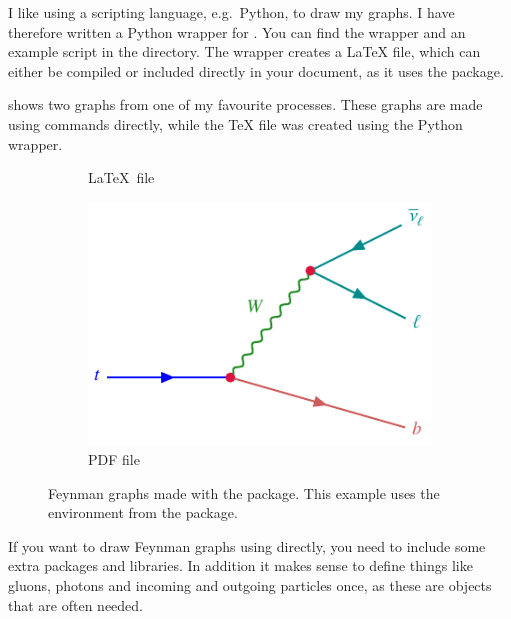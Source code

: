 I like using a scripting language, e.g.\ Python, to draw my graphs.
I have therefore written a Python wrapper for .
You can find the wrapper and an example script in the  directory.
The wrapper creates a \LaTeX{} file,
which can either be compiled or included directly in your document,
as it uses the  package.

 shows two graphs from one of my favourite processes.
These graphs are made using  commands directly,
while the \TeX{} file was created using the Python wrapper.

\begin{figure}[htbp]
  \centering
  \begin{subfigure}{0.5\figwidth}
    \centering
    \caption{\LaTeX\ file}%
    \label{fig:feyn:tdecay1}
  \end{subfigure}
  \qquad
  \begin{subfigure}{0.5\figwidth}
    \centering
    \includegraphics[width=0.5\figwidth]{../tikz/tdecay}
    \caption{PDF file}%
    \label{fig:feyn:tdecay2}
  \end{subfigure}
  \caption{Feynman graphs made with the  package.
    This example uses the  environment from the  package.}%
  \label{fig:feyn:tdecay}
\end{figure}

If you want to draw Feynman graphs using \TikZ directly,
you need to include some extra \TikZ packages and libraries.
In addition it makes sense to
define things like gluons, photons and incoming and outgoing particles
once, as these are objects that are often needed.

